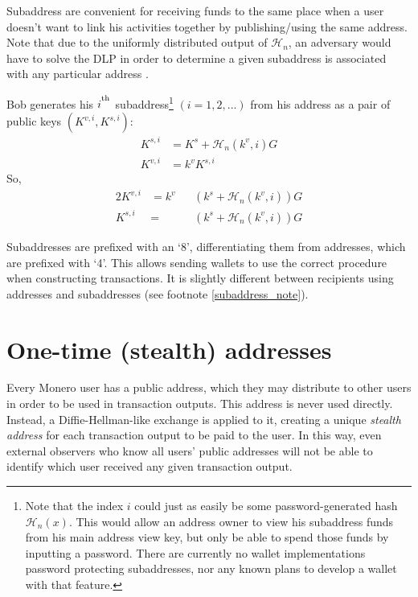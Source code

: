 Subaddress are convenient for receiving funds to the same place when a user doesn’t want to link his activities together by publishing/using the same address. Note that due to the uniformly distributed output of $\mathcal{H}_n$, an adversary would have to solve the DLP in order to determine a given subaddress is associated with any particular address \cite{MRL-0006}.

Bob generates his $i^\textsuperscript{th}$ subaddress\footnote{Note that the index $i$ could just as easily be some password-generated hash $\mathcal{H}_n(x)$. This would allow an address owner to view his subaddress funds from his main address view key, but only be able to spend those funds by inputting a password. There are currently no wallet implementations password protecting subaddresses, nor any known plans to develop a wallet with that feature.} $(i = 1, 2, ...)$ from his address as a pair of public keys $(K^{v,i}, K^{s,i})$:\\
\begin{align*}
    K^{s,i} &= K^s + \mathcal{H}_n(k^v, i) G\\
    K^{v,i} &= k^v K^{s,i}
\end{align*}
\quad So,
\begin{alignat*}{2}
    K^{v,i} &= k^v&&(k^s + \mathcal{H}_n(k^v, i))G\\
    K^{s,i} &= &&(k^s + \mathcal{H}_n(k^v, i))G
\end{alignat*}
    
Subaddresses are prefixed with an ‘8’, differentiating them from addresses, which are prefixed with ‘4’. This allows sending wallets to use the correct procedure when constructing transactions. It is slightly different between recipients using addresses and subaddresses (see footnote \ref{subaddress_note}).




\section{One-time (stealth) addresses}
\label{sec:one-time-addresses}

Every Monero user has a public address, which they may distribute to other users in order to be used in transaction outputs. This address is never used directly. Instead, a Diffie-Hellman-like exchange is applied to it, creating a unique {\em stealth address} for each transaction output to be paid to the user. In this way, even external observers who know all users’ public addresses will not be able to identify which user received any given transaction output.
\\

